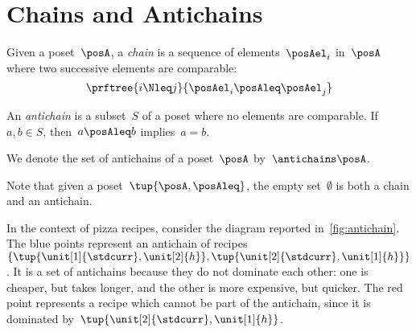 

\section{Chains and Antichains}
\label{sec:chains-antichains}

\begin{definition}
  \label{def:chain}
  Given a poset~$\posA$, a \emph{chain} is a sequence of elements~${\posAel_i}$ in~$\posA$ where two successive elements are comparable:
  \begin{equation}
    \prftree{i \Nleq j }{\posAel_i \posAleq \posAel_j}
  \end{equation}
\end{definition}


\begin{definition}
  \label{def:antichain}
  An \emph{antichain} is a subset~$S$ of a poset where no elements are comparable.
  If~$a,b \in S$, then~$a \posAleq b$ implies~$a=b$.
\end{definition}

We denote the set of antichains of a poset~$\posA$ by~$\antichains\posA$.

\begin{remark}
  Note that given a poset~$\tup{\posA,\posAleq}$, the empty set~$\emptyset$ is both a chain and an antichain.
\end{remark}

In the context of pizza recipes, consider the diagram reported in~\cref{fig:antichain}.
The blue points represent an antichain of recipes~$\{\tup{\unit[1]{\stdcurr},\unit[2]{h}},\tup{\unit[2]{\stdcurr},\unit[1]{h}}\}$.
It is a set of antichains because they do not dominate each other: one is cheaper, but takes longer, and the other is more expensive, but quicker.
The red point represents a recipe which cannot be part of the antichain, since it is dominated by~$\tup{\unit[2]{\stdcurr},\unit[1]{h}}$.

